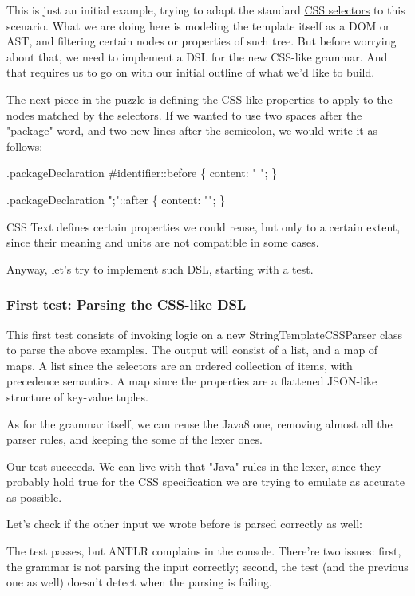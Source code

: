 \documentclass[11pt]{article}
\begin{document}
This is just an initial example, trying to adapt the standard \href{http://www.w3.org/TR/2011/REC-css3-selectors-20110929/}{CSS selectors} to this scenario. What we are doing here is
modeling the template itself as a DOM or AST, and filtering certain nodes or properties of such tree. But before worrying
about that, we need to implement a DSL for the new CSS-like grammar. And that requires us to go on with our initial
outline of what we'd like to build.

The next piece in the puzzle is defining the CSS-like properties to apply to the nodes matched by the selectors.
If we wanted to use two spaces after the "package" word, and two new lines after the semicolon, we would write it as follows:

.packageDeclaration \#identifier::before \{
  content: "  ";
\}

.packageDeclaration ";"::after \{
  content: "\n\n";
\}

CSS Text defines certain properties we could reuse, but only to a certain extent, since their meaning and units are
not compatible in some cases.

Anyway, let's try to implement such DSL, starting with a test.

\subsubsection{First test: Parsing the CSS-like DSL}
\label{sec-1-4-2}

This first test consists of invoking logic on a new StringTemplateCSSParser class to parse the above examples. The output
will consist of a list, and a map of maps. A list since the selectors are an ordered collection of items, with precedence semantics.
A map since the properties are a flattened JSON-like structure of key-value tuples.


As for the grammar itself, we can reuse the Java8 one, removing almost all the parser rules, and keeping the some of the lexer
ones.


Our test succeeds. We can live with that "Java" rules in the lexer, since they probably hold true for the CSS
specification we are trying to emulate as accurate as possible.

Let's check if the other input we wrote before is parsed correctly as well:


The test passes, but ANTLR complains in the console. There're two issues: first, the grammar is not parsing the input correctly; second, the test (and the previous one as well) doesn't
detect when the parsing is failing.
\end{document}
